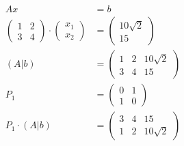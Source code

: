 \begin{align}
	Ax                                                       & = b                                         \\
	\begin{pmatrix}
		1 & 2 \\
		3 & 4
	\end{pmatrix} \cdot \begin{pmatrix}
		                    x_1 \\
		                    x_2
	                    \end{pmatrix}                      & = \begin{pmatrix}
		                                                           10 \sqrt{2} \\
		                                                           15
	                                                           \end{pmatrix}                              \\
	\left( A | b \right)                                     & = \left( \begin{array}{cc|c}
			                                                                    1 & 2 & 10 \sqrt{2} \\
			                                                                    3 & 4 & 15
		                                                                    \end{array} \right)                \\
	P_1                                                      & = \begin{pmatrix}
		                                                             0 & 1 \\
		                                                             1 & 0
	                                                             \end{pmatrix}                            \\
	P_1 \cdot \left( A | b \right)                           & = \left( \begin{array}{cc|c}
			                                                                    3 & 4 & 15          \\
			                                                                    1 & 2 & 10 \sqrt{2}
		                                                                    \end{array} \right)                \\

\end{align}
